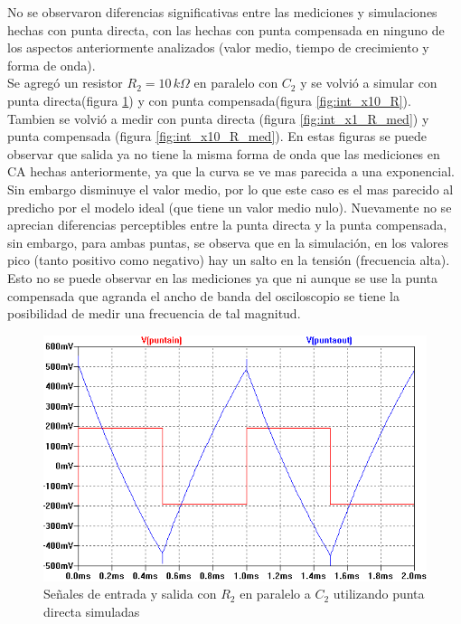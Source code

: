 \documentclass[10pt,spanish,a4paper,openany,notitlepage]{article}
\begin{document}
No se observaron diferencias significativas entre las mediciones y simulaciones hechas con punta directa, con las hechas con punta compensada en ninguno de los aspectos anteriormente analizados (valor medio, tiempo de crecimiento y forma de onda). \\ 

Se agregó un resistor $R_2 = 10\,\unit{k\Omega}$ en paralelo con $C_2$ y se volvió
a simular con punta directa(figura \ref{fig:int_x1_R}) y con punta compensada(figura \ref{fig:int_x10_R}). Tambien se volvió a medir con punta directa (figura \ref{fig:int_x1_R_med}) y punta compensada (figura \ref{fig:int_x10_R_med}). En estas figuras se puede observar que salida ya no tiene la misma forma de onda que las mediciones en CA hechas anteriormente, ya que la curva se ve mas parecida a una exponencial. Sin embargo disminuye el valor medio, por lo que este caso es el mas parecido al predicho por el modelo ideal (que tiene un valor medio nulo). Nuevamente no se aprecian diferencias perceptibles entre la punta directa y la punta compensada, sin embargo, para ambas puntas, se observa que en la simulación, en los valores pico (tanto positivo como negativo) hay un salto en la tensión (frecuencia alta). Esto no se puede observar en las mediciones ya que ni aunque se use la punta compensada que agranda el ancho de banda del osciloscopio se tiene la posibilidad de medir una frecuencia de tal magnitud.


\begin{figure}[H]
\centering
\includegraphics[scale=0.8]{simulaciones/BconR2Puntax1.png}
\caption{Señales de entrada y salida con $R_2$ en paralelo a $C_2$ utilizando punta directa simuladas}
\label{fig:int_x1_R}
\end{figure}
\end{document}
